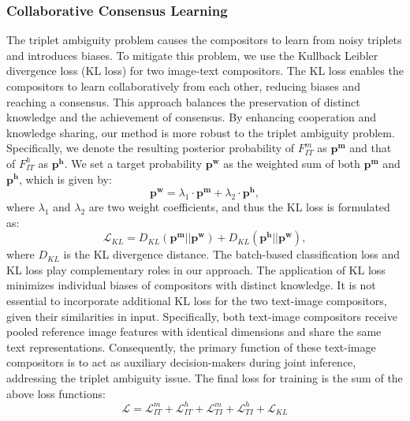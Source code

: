 \documentclass[sigconf]{acmart}
\begin{document}
\subsubsection{Collaborative Consensus Learning}
The triplet ambiguity problem causes the compositors to learn from noisy triplets and introduces biases. To mitigate this problem, we use the Kullback Leibler divergence loss (KL loss) for two image-text compositors. The KL loss enables the compositors to learn collaboratively from each other, reducing biases and reaching a consensus. This approach balances the preservation of distinct knowledge and the achievement of consensus. By enhancing cooperation and knowledge sharing, our method is more robust to the triplet ambiguity problem. 
Specifically, we denote the resulting posterior probability of $F_{IT}^m$ as $\bm{p^m}$ and that of $F_{IT}^h$ as $\bm{p^h}$. We set a target probability $\bm{p^w}$ as the weighted sum of both $\bm{p^m}$ and $\bm{p^h}$, which is given by:
\begin{equation}
    \bm{p^w} = \lambda_1 \cdot \bm{p^m} + \lambda_2 \cdot \bm{p^h},
\end{equation}
where $\lambda_{1}$ and $\lambda_{2}$ are two weight coefficients, and thus the KL loss is formulated as:
\begin{equation}
\label{eq:losskl}
    \mathcal{L}_{KL} = D_{KL}(\bm{p^m}||\bm{p^w}) + D_{KL}(\bm{p^h}||\bm{p^w}),
\end{equation}
where $D_{KL}$ is the KL divergence distance. The batch-based classification loss and KL loss play complementary roles in our approach. The application of KL loss minimizes individual biases of compositors with distinct knowledge. It is not essential to incorporate additional KL loss for the two text-image compositors, given their similarities in input. Specifically, both text-image compositors receive pooled reference image features with identical dimensions and share the same text representations. Consequently, the primary function of these text-image compositors is to act as auxiliary decision-makers during joint inference, addressing the triplet ambiguity issue.
The final loss for training is the sum of the above loss functions:
\begin{equation}
    \mathcal{L} = \mathcal{L}^m_{IT}+\mathcal{L}^h_{IT}+\mathcal{L}^m_{TI}+\mathcal{L}^h_{TI}+\mathcal{L}_{KL}
\end{equation}
\end{document}
